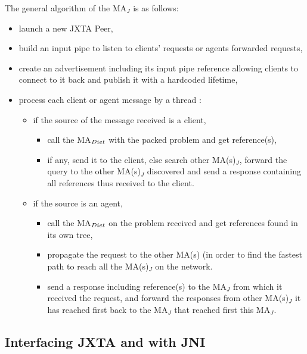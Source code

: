 The general algorithm of the MA$_{J}$ is as follows:

\begin{itemize}
\item{launch a new JXTA Peer,}
\item{build an input pipe to listen to clients' requests or agents
    forwarded requests,}
\item{create an advertisement including its input pipe reference
    allowing clients to connect to it back and publish it with a
    hardcoded lifetime,}
\item{process each client or agent message by a thread :
\begin{itemize}
\item{if the source of the message received is a client,}
  \begin{itemize}
  \item{call the MA$_{{\sc Diet}}$ with the packed problem and get \sed
      reference(s),}
  \item{if any, send it to the client, else search other MA(s)$_{J}$,
      forward the query to the other MA(s)$_{J}$ discovered and
      send a response containing all \sed references thus received to
      the client.}
  \end{itemize}
\item{if the source is an agent,}
          \begin{itemize}
          \item{call the MA$_{{\sc Diet}}$ on the problem received and get
              \sed references found in its own \diet tree, }
          \item{propagate the request to the other MA(s) (in order to
              find the fastest path to reach all the MA(s)$_{J}$ on
              the network.}
          \item{send a response including \sed reference(s) to the
              MA$_{J}$ from which it received the request, and forward
              the responses from other MA(s)$_{J}$ it has reached
              first back to the MA$_{J}$ that reached first this
              MA$_{J}$.}
          \end{itemize}
\end{itemize}}
\end{itemize}

\subsection{Interfacing JXTA and \diet with JNI}
\label{ssec:jni}

